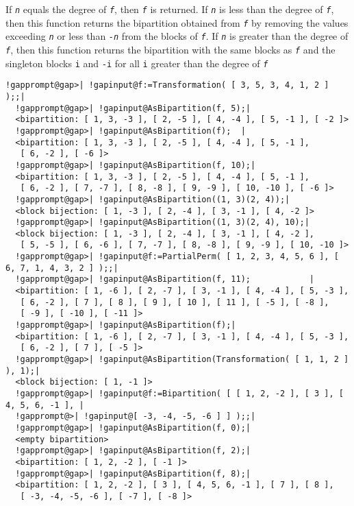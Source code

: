 \documentclass[a4paper,11pt]{report}
\begin{document}
{{{\begin{description}
 If \mbox{\texttt{\mdseries\slshape n}} equals the degree of \mbox{\texttt{\mdseries\slshape f}}, then \mbox{\texttt{\mdseries\slshape f}} is returned. If \mbox{\texttt{\mdseries\slshape n}} is less than the degree of \mbox{\texttt{\mdseries\slshape f}}, then this function returns the bipartition obtained from \mbox{\texttt{\mdseries\slshape f}} by removing the values exceeding \mbox{\texttt{\mdseries\slshape n}} or less than \mbox{\texttt{\mdseries\slshape -n}} from the blocks of \mbox{\texttt{\mdseries\slshape f}}. If \mbox{\texttt{\mdseries\slshape n}} is greater than the degree of \mbox{\texttt{\mdseries\slshape f}}, then this function returns the bipartition with the same blocks as \mbox{\texttt{\mdseries\slshape f}} and the singleton blocks \texttt{i} and \texttt{-i} for all \texttt{i} greater than the degree of \mbox{\texttt{\mdseries\slshape f}} 
\end{description}
 
\begin{Verbatim}[commandchars=!@|,fontsize=\small,frame=single,label=Example]
  !gapprompt@gap>| !gapinput@f:=Transformation( [ 3, 5, 3, 4, 1, 2 ] );;|
  !gapprompt@gap>| !gapinput@AsBipartition(f, 5);|
  <bipartition: [ 1, 3, -3 ], [ 2, -5 ], [ 4, -4 ], [ 5, -1 ], [ -2 ]>
  !gapprompt@gap>| !gapinput@AsBipartition(f);  |
  <bipartition: [ 1, 3, -3 ], [ 2, -5 ], [ 4, -4 ], [ 5, -1 ], 
   [ 6, -2 ], [ -6 ]>
  !gapprompt@gap>| !gapinput@AsBipartition(f, 10);|
  <bipartition: [ 1, 3, -3 ], [ 2, -5 ], [ 4, -4 ], [ 5, -1 ], 
   [ 6, -2 ], [ 7, -7 ], [ 8, -8 ], [ 9, -9 ], [ 10, -10 ], [ -6 ]>
  !gapprompt@gap>| !gapinput@AsBipartition((1, 3)(2, 4));|
  <block bijection: [ 1, -3 ], [ 2, -4 ], [ 3, -1 ], [ 4, -2 ]>
  !gapprompt@gap>| !gapinput@AsBipartition((1, 3)(2, 4), 10);|
  <block bijection: [ 1, -3 ], [ 2, -4 ], [ 3, -1 ], [ 4, -2 ], 
   [ 5, -5 ], [ 6, -6 ], [ 7, -7 ], [ 8, -8 ], [ 9, -9 ], [ 10, -10 ]>
  !gapprompt@gap>| !gapinput@f:=PartialPerm( [ 1, 2, 3, 4, 5, 6 ], [ 6, 7, 1, 4, 3, 2 ] );;|
  !gapprompt@gap>| !gapinput@AsBipartition(f, 11);            |
  <bipartition: [ 1, -6 ], [ 2, -7 ], [ 3, -1 ], [ 4, -4 ], [ 5, -3 ], 
   [ 6, -2 ], [ 7 ], [ 8 ], [ 9 ], [ 10 ], [ 11 ], [ -5 ], [ -8 ], 
   [ -9 ], [ -10 ], [ -11 ]>
  !gapprompt@gap>| !gapinput@AsBipartition(f);|
  <bipartition: [ 1, -6 ], [ 2, -7 ], [ 3, -1 ], [ 4, -4 ], [ 5, -3 ], 
   [ 6, -2 ], [ 7 ], [ -5 ]>
  !gapprompt@gap>| !gapinput@AsBipartition(Transformation( [ 1, 1, 2 ] ), 1);|
  <block bijection: [ 1, -1 ]>
  !gapprompt@gap>| !gapinput@f:=Bipartition( [ [ 1, 2, -2 ], [ 3 ], [ 4, 5, 6, -1 ], |
  !gapprompt@>| !gapinput@[ -3, -4, -5, -6 ] ] );;|
  !gapprompt@gap>| !gapinput@AsBipartition(f, 0);|
  <empty bipartition>
  !gapprompt@gap>| !gapinput@AsBipartition(f, 2);|
  <bipartition: [ 1, 2, -2 ], [ -1 ]>
  !gapprompt@gap>| !gapinput@AsBipartition(f, 8);|
  <bipartition: [ 1, 2, -2 ], [ 3 ], [ 4, 5, 6, -1 ], [ 7 ], [ 8 ], 
   [ -3, -4, -5, -6 ], [ -7 ], [ -8 ]>
\end{Verbatim}
 }

}}
\end{document}
